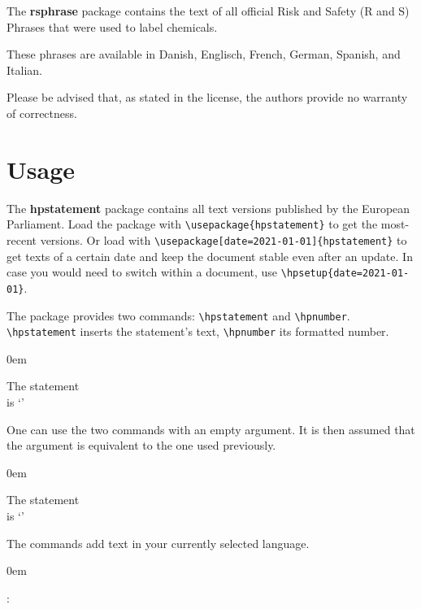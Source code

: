\documentclass[a4paper,notitlepage,parskip=half]{scrreprt}
\begin{document}
\bigskip

The \textbf{rsphrase} package contains the text of all official
Risk and Safety (R and S) Phrases that were used to label chemicals.

These phrases are
available in Danish, Englisch, French, German, Spanish, and
Italian.

\bigskip

Please be advised that, as stated in the license, the authors provide no
warranty of correctness.


\section{Usage}

The \textbf{hpstatement} package contains all text versions published by the European Parliament.
Load the package with \verb|\usepackage{hpstatement}| to get the most-recent versions.
Or load with \verb|\usepackage[date=2021-01-01]{hpstatement}| to get texts of a certain date and keep the document stable even after an update.
In case you would need to switch within a document, use \verb|\hpsetup{date=2021-01-01}|.

The package provides two commands: \verb|\hpstatement| and \verb|\hpnumber|.
\verb|\hpstatement| inserts the statement's text,
\verb|\hpnumber| its formatted number.\bigskip

\begin{addmargin}[1em]{0em}
\begin{SideBySideExample}[xrightmargin=7cm]
  The statement \\
  is `'
\end{SideBySideExample}
\end{addmargin}
\bigskip

\noindent One can use the two commands with an empty argument. It is then assumed that the argument is equivalent to the one used previously. \bigskip

\begin{addmargin}[1em]{0em}
\begin{SideBySideExample}[xrightmargin=7cm]
  The statement \\
  is `\hpstatement{}'
\end{SideBySideExample}
\end{addmargin}
\bigskip

\noindent The commands add text in your currently selected language.
\bigskip

\begin{addmargin}[1em]{0em}
\begin{SideBySideExample}[xrightmargin=7cm]
  :
  \hpstatement{}
\end{SideBySideExample}
\end{addmargin}
\bigskip
\end{document}
